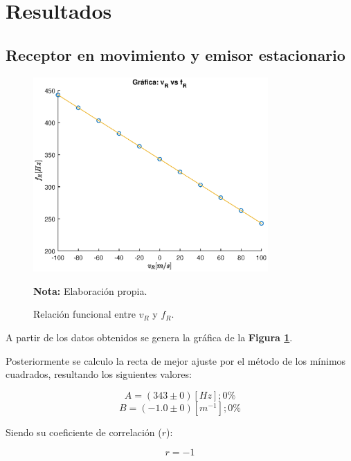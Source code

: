 \documentclass[letter,11pt]{article}
\newcommand{\source}[1]{\vspace{-11pt} \caption*{\small{\textbf{Nota:} {#1}}}}
\begin{document}
\section{Resultados}

\subsection{Receptor en movimiento y emisor estacionario}

\begin{figure}
\centering
\includegraphics[width=0.80\textwidth]{resources/m1.eps}
\caption{Relación funcional entre $v_R$ y $f_R$.}
\label{figura5}
\source{Elaboración propia.}
\end{figure}

A partir de los datos obtenidos se genera la gráfica de la
\textbf{Figura \ref{figura5}}.

Posteriormente se calculo la recta de mejor ajuste por el método de los mínimos
cuadrados, resultando los siguientes valores:

\begin{equation*}
    A = (343 \pm 0) [Hz]; 0\%
\end{equation*}
\begin{equation*}
    B = (-1.0 \pm 0) [m^{-1}]; 0\%
\end{equation*}
\vspace{0.10cm}

Siendo su coeficiente de correlación ($r$):

\begin{equation*}
    r = -1
\end{equation*}
\vspace{0.10cm}
\end{document}
